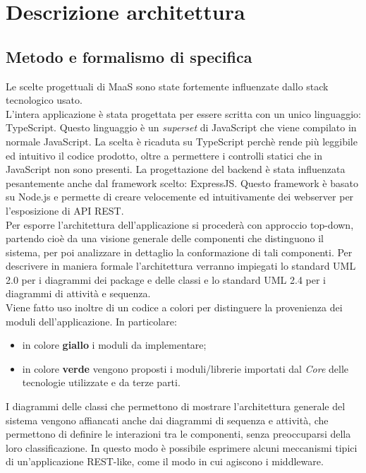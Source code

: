 \newpage
\section{Descrizione architettura}
\subsection{Metodo e formalismo di specifica}
Le scelte progettuali di MaaS sono state fortemente influenzate dallo stack tecnologico usato. \\
L'intera applicazione è stata progettata per essere scritta con un unico linguaggio: TypeScript. Questo linguaggio è un \textit{superset} di JavaScript che viene compilato in normale JavaScript. La scelta è ricaduta su TypeScript perchè rende più leggibile ed intuitivo il codice prodotto, oltre a permettere i controlli statici che in JavaScript non sono presenti.
La progettazione del backend è stata influenzata pesantemente anche dal framework scelto: ExpressJS. Questo framework è basato su Node.js e permette di creare velocemente ed intuitivamente dei webserver per l'esposizione di API REST. \\
Per esporre l'architettura dell'applicazione si procederà con approccio top-down, partendo cioè da una visione generale delle componenti che distinguono il sistema, per poi analizzare in dettaglio la conformazione di tali componenti. Per descrivere in maniera formale l'architettura verranno impiegati lo standard UML 2.0 per i diagrammi dei package e delle classi e lo standard UML 2.4 per i diagrammi di attività e sequenza. \\

Viene fatto uso inoltre di un codice a colori per distinguere la provenienza dei moduli dell'applicazione. In particolare:
\begin{itemize}
\item in colore \textbf{giallo} i moduli da implementare;
\item in colore \textbf{verde} vengono proposti i moduli/librerie importati dal \textit{Core} delle tecnologie utilizzate e da terze parti.
\end{itemize}

I diagrammi delle classi che permettono di mostrare l'architettura generale del sistema vengono affiancati anche dai diagrammi di sequenza e attività, che permettono di definire le interazioni tra le componenti, senza preoccuparsi della loro classificazione. In questo modo è possibile esprimere alcuni meccanismi tipici di un'applicazione REST-like, come il modo in cui agiscono i middleware. 

